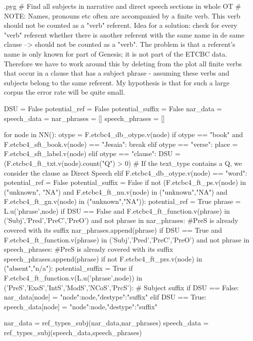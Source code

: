 \documentclass{report}
\makeatletter
\newenvironment{python}{%
  \VerbatimEnvironment
  \minted@resetoptions
  \setkeys{minted@opt}{}
      \begin{VerbatimOut}{\jobname.pyg}}
{%
      \end{VerbatimOut}
      \minted@pygmentize{python}
      \DeleteFile{\jobname.pyg}}
\makeatother
\begin{document}
\begin{python}
# Find all subjects in narrative and direct speech sections in whole OT 
# NOTE: Names, pronouns etc often are accompanied by a finite verb. This verb should not be counted as a "verb" referent. Idea for a solution: check for every "verb" referent whether there is another referent with the same name in de same clause --> should not be counted as a "verb". The problem is that a referent's name is only known for part of Genesis; it is not part of the ETCBC data. Therefore we have to work around this by deleting from the plot all finite verbs that occur in a clause that has a subject phrase - assuming these verbs and subjects belong to the same referent. My hypothesis is that for such a large corpus the error rate will be quite small.

DSU = False
potential_ref = False
potential_suffix = False
nar_data = {}
speech_data = {}
nar_phrases = []
speech_phrases = []

for node in NN():
    otype = F.etcbc4_db_otype.v(node)
    if otype == "book" and F.etcbc4_sft_book.v(node) == "Jesaia":
        break
    elif otype == "verse":
        place = F.etcbc4_sft_label.v(node)
    elif otype == "clause":
        DSU = (F.etcbc4_ft_txt.v(node).count("Q") > 0)    # If the text_type contains a Q, we consider the clause as Direct Speech
    elif F.etcbc4_db_otype.v(node) == "word":
        potential_ref = False
        potential_suffix = False
        if not (F.etcbc4_ft_ps.v(node) in ("unknown", "NA") and F.etcbc4_ft_nu.v(node) in ("unknown","NA") and F.etcbc4_ft_gn.v(node) in ("unknown","NA")):
            potential_ref = True
            phrase = L.u('phrase',node)
            if DSU == False and F.etcbc4_ft_function.v(phrase) in ('Subj','Pred','PreC','PreO') and not phrase in nar_phrases: #PreS is already covered with its suffix
                nar_phrases.append(phrase)
            if DSU == True and F.etcbc4_ft_function.v(phrase) in ('Subj','Pred','PreC','PreO') and not phrase in speech_phrases: #PreS is already covered with its suffix
                speech_phrases.append(phrase) 
        if not F.etcbc4_ft_prs.v(node) in ("absent","n/a"):
            potential_suffix = True
            if F.etcbc4_ft_function.v(L.u('phrase',node)) in ('PreS','ExsS','IntS','ModS','NCoS','PrcS'): # Subject suffix
                if DSU == False:
                    nar_data[node] = {"node":node,"destype":"suffix"}
                elif DSU == True:
                    speech_data[node] = {"node":node,"destype":"suffix"}

nar_data = ref_types_subj(nar_data,nar_phrases)
speech_data = ref_types_subj(speech_data,speech_phrases)

\end{python}
\end{document}
